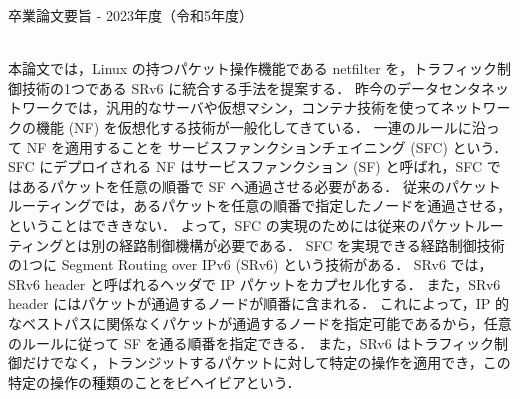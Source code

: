 卒業論文要旨 - 2023年度（令和5年度）
\begin{center}
\begin{large}
\end{large}
\end{center}

~ \\
本論文では，Linux の持つパケット操作機能である netfilter を，トラフィック制御技術の1つである SRv6 に統合する手法を提案する．
昨今のデータセンタネットワークでは，汎用的なサーバや仮想マシン，コンテナ技術を使ってネットワークの機能 (NF) を仮想化する技術が一般化してきている．
一連のルールに沿って NF を適用することを サービスファンクションチェイニング (SFC) という．
SFC にデプロイされる NF はサービスファンクション (SF) と呼ばれ，SFC ではあるパケットを任意の順番で SF へ通過させる必要がある．
従来のパケットルーティングでは，あるパケットを任意の順番で指定したノードを通過させる，ということはでききない．
よって，SFC の実現のためには従来のパケットルーティングとは別の経路制御機構が必要である．
SFC を実現できる経路制御技術の1つに Segment Routing over IPv6 (SRv6) という技術がある．
SRv6 では，SRv6 header と呼ばれるヘッダで IP パケットをカプセル化する．
また，SRv6 header にはパケットが通過するノードが順番に含まれる．
これによって，IP 的なベストパスに関係なくパケットが通過するノードを指定可能であるから，任意のルールに従って SF を通る順番を指定できる．
また，SRv6 はトラフィック制御だけでなく，トランジットするパケットに対して特定の操作を適用でき，この特定の操作の種類のことをビヘイビアという．

